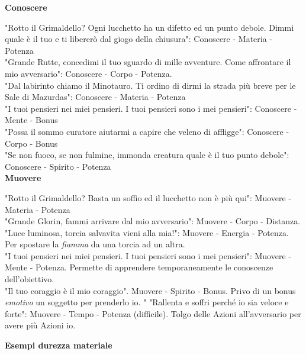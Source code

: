 \documentclass[a4paper,twoside,openany]{book}
\begin{document}
\begin{multicols}{2}
\textbf{Conoscere}

"Rotto il Grimaldello? Ogni lucchetto ha un difetto ed un punto debole. Dimmi quale è il tuo e ti libererò dal giogo della chiusura": Conoscere - Materia - Potenza\\
"Grande Rutte, concedimi il tuo sguardo di mille avventure. Come affrontare il mio avversario": Conoscere - Corpo - Potenza.\\
"Dal labirinto chiamo il Minotauro. Ti ordino di dirmi la strada più breve per le Sale di Mazurdas": Conoscere - Materia - Potenza\\
"I tuoi pensieri nei miei pensieri. I tuoi pensieri sono i mei pensieri": Conoscere - Mente - Bonus\\
"Possa il sommo curatore aiutarmi a capire che veleno di affligge": Conoscere - Corpo - Bonus\\
"Se non fuoco, se non fulmine, immonda creatura quale è il tuo punto debole": Conoscere - Spirito - Potenza\\

\textbf{Muovere}

"Rotto il Grimaldello? Basta un soffio ed il lucchetto non è più qui": Muovere - Materia - Potenza\\
"Grande Glorin, fammi arrivare dal mio avversario": Muovere - Corpo - Distanza.\\
"Luce luminosa, torcia salvavita vieni alla mia!": Muovere - Energia - Potenza. Per spostare la \emph{fiamma} da una torcia ad un altra.\\
"I tuoi pensieri nei miei pensieri. I tuoi pensieri sono i mei pensieri": Muovere - Mente - Potenza. Permette di apprendere temporaneamente le conoscenze dell'obiettivo.\\
"Il tuo coraggio è il mio coraggio". Muovere - Spirito - Bonus. Privo di un bonus \emph{emotivo} un soggetto per prenderlo io.
"
"Rallenta e soffri perché io sia veloce e forte": Muovere - Tempo - Potenza (difficile). Tolgo delle Azioni all'avversario per avere più Azioni io.

\bigskip

\textbf{Esempi durezza materiale}


\end{multicols}
\end{document}
